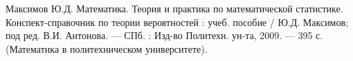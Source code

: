 \documentclass[12pt,a4paper]{article}
\begin{document}
	\begin{thebibliography}{1}
		  Максимов Ю.Д. Математика. Теория и практика по математической статистике. Конспект-справочник по теории вероятностей : учеб. пособие /
		Ю.Д. Максимов; под ред. В.И. Антонова. — СПб. : Изд-во Политехн.
		ун-та, 2009. — 395 с. (Математика в политехническом университете).

	\end{thebibliography}
\end{document}

